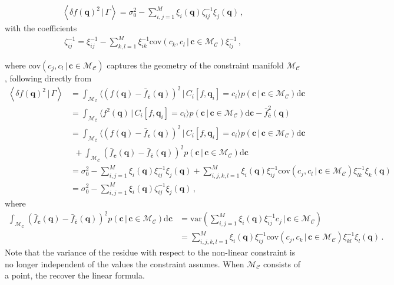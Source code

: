 \documentclass[a4paper, 11pt]{article}
\begin{document}
\begin{itemize}
\begin{framed}
\begin{align}
\left \langle \delta f (\bm{q})^2\,|\,\Gamma\right\rangle =
\sigma_0^2 - \sum_{i,j=1}^M\xi_i(\bm{q}) \zeta_{ij}^{-1} \xi_j(\bm{q}) 
\,,\label{eq:variance_Nonlinear}
\end{align}
with the coefficients
\begin{align}
\zeta_{ij}^{-1}= \xi_{ij}^{-1}-\sum_{k,l=1}^M\xi_{ik}^{-1}\text{cov}(c_k, c_l\,|\,\bm{c}\in\mathcal{M}_\mathcal{C})\xi_{lj}^{-1}\,,
\end{align}
\end{framed}
where $\text{cov}(c_j, c_l\,|\,\bm{c}\in\mathcal{M}_\mathcal{C})$ captures the geometry of the constraint manifold $\mathcal{M}_\mathcal{C}$, following directly from
\begin{align}
\left \langle \delta f (\bm{q})^2\,|\,\Gamma\right\rangle 
&= \int_{\mathcal{M}_\mathcal{C}} \langle (f(\bm{q})-\bar{f}_{\bar{\bm{c}}}(\bm{q}))^2\,|\,C_i[f,\bm{q}_i]=c_i\rangle p(\bm{c}\,|\,\bm{c}\in\mathcal{M}_{\mathcal{C}})\mathrm{d}\bm{c}\nonumber \\
&= \int_{\mathcal{M}_\mathcal{C}} \langle f^2(\bm{q})\,|\,C_i[f,\bm{q}_i]=c_i\rangle p(\bm{c}\,|\,\bm{c}\in\mathcal{M}_{\mathcal{C}})\mathrm{d}\bm{c} - \bar{f}_{\bar{\bm{c}}}^2(\bm{q})\nonumber \\
&= \int_{\mathcal{M}_\mathcal{C}} \langle (f(\bm{q})-\bar{f}_{\bm{c}}(\bm{q}))^2\,|\,C_i[f,\bm{q}_i]=c_i\rangle p(\bm{c}\,|\,\bm{c}\in\mathcal{M}_{\mathcal{C}})\mathrm{d}\bm{c} \nonumber \\
&\ \ +\int_{\mathcal{M}_\mathcal{C}} (\bar{f}_{\bm{c}}(\bm{q})- \bar{f}_{\bar{\bm{c}}}(\bm{q}))^2p(\bm{c}\,|\,\bm{c}\in\mathcal{M}_{\mathcal{C}})\mathrm{d}\bm{c} \nonumber \\
&=  \sigma_0^2 - \sum_{i,j=1}^M\xi_i(\bm{q}) \xi_{ij}^{-1} \xi_j(\bm{q}) + \sum_{i,j,k,l=1}^M \xi_{i}(\bm{q})\xi_{ij}^{-1}\text{cov}(c_j, c_l\,|\,\bm{c}\in\mathcal{M}_\mathcal{C})\xi_{lk}^{-1}\xi_{k}(\bm{q})\nonumber\\
&=
\sigma_0^2 - \sum_{i,j=1}^M\xi_i(\bm{q}) \zeta_{ij}^{-1} \xi_j(\bm{q})\,,
\end{align}
where
\begin{align}
\int_{\mathcal{M}_\mathcal{C}} (\bar{f}_{\bm{c}}(\bm{q})- \bar{f}_{\bar{\bm{c}}}(\bm{q}))^2p(\bm{c}\,|\,\bm{c}\in\mathcal{M}_{\mathcal{C}})\mathrm{d}\bm{c} 
&= \text{var}\left(\sum_{i,j=1}^M\xi_i(\bm{q})\xi_{ij}^{-1}c_j\,|\,\bm{c}\in \mathcal{M}_\mathcal{C}\right)\\
&=\sum_{i,j,k,l=1}^M \xi_i(\bm{q})\xi_{ij}^{-1}\text{cov}(c_j,c_k\,|\,\bm{c}\in\mathcal{M}_\mathcal{C})\xi_{kl}^{-1}\xi_l(\bm{q})\,.\nonumber
\end{align}
Note that the variance of the residue with respect to the non-linear constraint is no longer independent of the values the constraint assumes. When $\mathcal{M}_\mathcal{C}$ consists of a point, the recover the linear formula.
\end{itemize}
\end{document}
